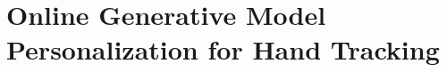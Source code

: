 \chapter{Online Generative Model Personalization for Hand Tracking} \label{ch:online}















%
%


